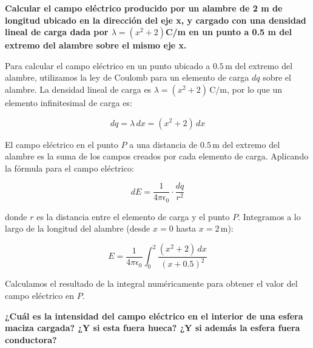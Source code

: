 \documentclass[12pt, answers]{exam} %
\begin{document}
\begin{questions}
\begin{center}
      \end{center}
    

    \question \large\textbf{Calcular el campo eléctrico producido por un alambre de 2 m de longitud ubicado en la dirección del eje x, y cargado con una densidad lineal de carga dada por $\lambda = (x^2 + 2)$C/m en un punto a 0.5 m del extremo del alambre sobre el mismo eje x.}

    
        Para calcular el campo eléctrico en un punto ubicado a \( 0.5 \, \text{m} \) del extremo del alambre, utilizamos la ley de Coulomb para un elemento de carga \( dq \) sobre el alambre. La densidad lineal de carga es \( \lambda = (x^2 + 2) \, \text{C/m} \), por lo que un elemento infinitesimal de carga es:
        
        \[
        dq = \lambda \, dx = (x^2 + 2) \, dx
        \]
        
        El campo eléctrico en el punto \( P \) a una distancia de \( 0.5 \, \text{m} \) del extremo del alambre es la suma de los campos creados por cada elemento de carga. Aplicando la fórmula para el campo eléctrico:
        
        \[
        dE = \frac{1}{4 \pi \epsilon_0} \cdot \frac{dq}{r^2}
        \]
        
        donde \( r \) es la distancia entre el elemento de carga y el punto \( P \). Integramos a lo largo de la longitud del alambre (desde \( x = 0 \) hasta \( x = 2 \, \text{m} \)):
        
        \[
        E = \frac{1}{4 \pi \epsilon_0} \int_0^2 \frac{(x^2 + 2) \, dx}{(x + 0.5)^2}
        \]
        
        Calculamos el resultado de la integral numéricamente para obtener el valor del campo eléctrico en \( P \).

    \question \large\textbf{¿Cuál es la intensidad del campo eléctrico en el interior de una esfera maciza cargada? ¿Y si esta fuera hueca? ¿Y si además la esfera fuera conductora?}


\end{questions}
\end{document}
